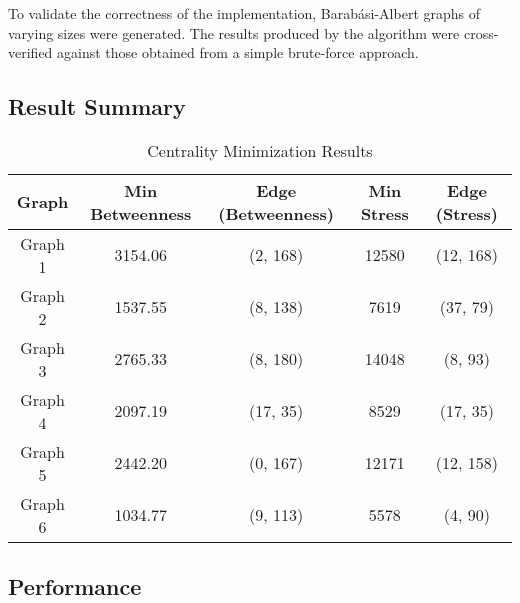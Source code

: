 \documentclass[12pt]{article}
\begin{document}
To validate the correctness of the implementation, Barabási-Albert graphs of
varying sizes were generated. The results produced by the algorithm were
cross-verified against those obtained from a simple brute-force approach.


\subsection{Result Summary}

\begin{table}[h]
	\centering
	\caption{Centrality Minimization Results}
	\begin{tabular}{|c|c|c|c|c|}
		\hline
		\textbf{Graph} & \textbf{Min Betweenness} & \textbf{Edge (Betweenness)} & \textbf{Min Stress} & \textbf{Edge (Stress)} \\
		\hline
		Graph 1        & 3154.06                  & (2, 168)                    & 12580               & (12, 168)              \\
		Graph 2        & 1537.55                  & (8, 138)                    & 7619                & (37, 79)               \\
		Graph 3        & 2765.33                  & (8, 180)                    & 14048               & (8, 93)                \\
		Graph 4        & 2097.19                  & (17, 35)                    & 8529                & (17, 35)               \\
		Graph 5        & 2442.20                  & (0, 167)                    & 12171               & (12, 158)              \\
		Graph 6        & 1034.77                  & (9, 113)                    & 5578                & (4, 90)                \\
		\hline
	\end{tabular}
\end{table}

\subsection{Performance}
\end{document}

